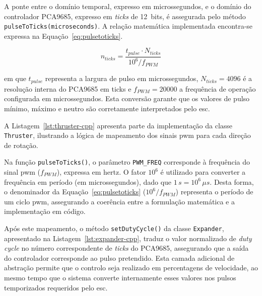 A ponte entre o domínio temporal, expresso em microssegundos, e o domínio do controlador PCA9685, expresso em \emph{ticks} de 12~bits, é assegurada pelo método \texttt{pulseToTicks(microseconds)}. A relação matemática implementada encontra-se expressa na Equação~\ref{eq:pulsetoticks}.  

\begin{equation}
n_{ticks} = \frac{t_{pulse} \cdot N_{ticks}}{10^6 / f_{PWM}}
\label{eq:pulsetoticks}
\end{equation}

em que \(t_{pulse}\) representa a largura de pulso em microssegundos, \(N_{ticks} = 4096\) é a resolução interna do PCA9685 em ticks e \(f_{PWM} = 20000\) a frequência de operação configurada em microssegundos. Esta conversão garante que os valores de pulso mínimo, máximo e neutro são corretamente interpretados pelo \gls{esc}.  

A Listagem~\ref{lst:thruster-cpp} apresenta parte da implementação da classe \texttt{Thruster}, ilustrando a lógica de mapeamento dos sinais \gls{pwm} para cada direção de rotação.  



Na função \texttt{pulseToTicks()}, o parâmetro \texttt{PWM\_FREQ} corresponde à frequência do sinal \gls{pwm} (\(f_{PWM}\)), expressa em hertz.  O fator \(10^6\) é utilizado para converter a frequência em período (em microssegundos), dado que \(1 \, s = 10^6 \, \mu s\). Desta forma, o denominador da Equação~\ref{eq:pulsetoticks} (\(10^6/f_{PWM}\)) representa o período de um ciclo \gls{pwm}, assegurando a coerência entre a formulação matemática e a implementação em código.

Após este mapeamento, o método \texttt{setDutyCycle()} da classe \texttt{Expander}, apresentado na Listagem~\ref{lst:expander-cpp}, traduz o valor normalizado de \emph{duty cycle} no número correspondente de \emph{ticks} do PCA9685, assegurando que a saída do controlador corresponde ao pulso pretendido. Esta camada adicional de abstração permite que o controlo seja realizado em percentagens de velocidade, ao mesmo tempo que o sistema converte internamente esses valores nos pulsos temporizados requeridos pelo \gls{esc}.  



